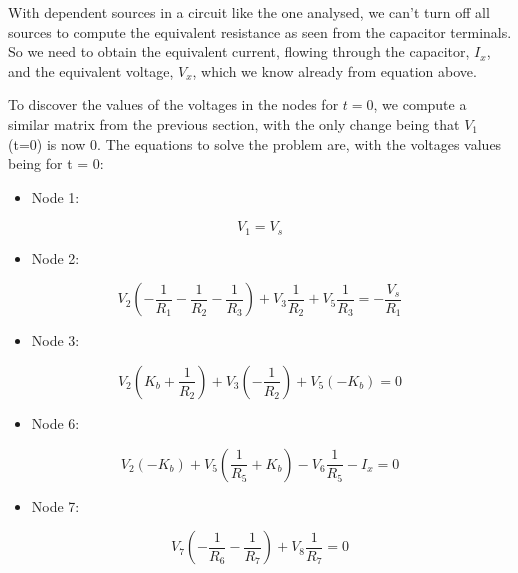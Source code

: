With dependent sources in a circuit like the one analysed, we can't turn off all sources to compute the equivalent resistance as seen from the capacitor terminals. So we need to obtain the equivalent current, flowing through the capacitor, $I_x$, and the equivalent voltage, $V_x$, which we know already from equation above.

To discover the values of the voltages in the nodes for $t = 0$, we compute a similar matrix from the previous section, with the only change being that  $V_1$(t=0) is now 0. The equations to solve the problem are, with the voltages values being for t = 0:

\begin{itemize}
    \item Node 1:
\end{itemize}
\begin{equation}
    V_{1} = V_{s}
\end{equation}

\begin{itemize}
    \item Node 2:
\end{itemize}
\begin{equation}
    V_{2}(-\frac{1}{R_{1}}-\frac{1}{R_{2}}-\frac{1}{R_{3}})+V_{3}\frac{1}{R_{2}}+V_{5}\frac{1}{R_{3}} = -\frac{V_{s}}{R_{1}}
\end{equation}

\begin{itemize}
    \item Node 3:
\end{itemize}
\begin{equation}
    V_{2}(K_{b}+\frac{1}{R_{2}})+V_{3}(-\frac{1}{R_{2}})+V_{5}(-K_{b}) = 0
\end{equation}

\begin{itemize}
    \item Node 6:
\end{itemize}
\begin{equation}
    V_2(-K_b)+V_5(\frac{1}{R_5} + K_b)-V_6\frac{1}{R_5} - I_x = 0
\end{equation}

\begin{itemize}
    \item Node 7:
\end{itemize}
\begin{equation}
    V_{7}(-\frac{1}{R_{6}}-\frac{1}{R_{7}})+V_{8}\frac{1}{R_{7}} = 0
\end{equation}

